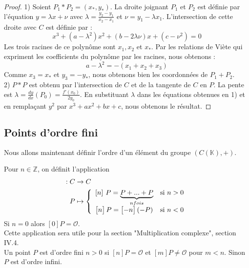 \documentclass[a4paper]{article}
\begin{document}
\begin{proof}
1) Soient $P_{1}*P_{2}=(x_{*},y_{*})$.
La droite joignant $P_{1}$ et $P_{2}$ est définie par l'équation $y=\lambda x+\nu$ avec $\lambda=\frac{y_{2}-y_{1}}{x_{2}-x_{1}}$ et $\nu=y_{1}-\lambda x_{1}$.
L'intersection de cette droite avec $C$ est définie par :
\begin{equation*}
x^3+(a-\lambda^2)x^2+(b-2\lambda\nu)x+(c-\nu^2)=0
\end{equation*}
Les trois racines de ce polynôme sont $x_{1},x_{2}$ et $x_{*}$.
Par les relations de Viète qui expriment les coefficients du polynôme par les racines, nous obtenons :
\begin{equation*}
a-\lambda^2=-(x_{1}+x_{2}+x_{3})
\end{equation*}
Comme $x_{3}=x_{*}$ et $y_{3}=-y_{*}$, nous obtenons bien les coordonnées de $P_{1}+P_{2}$. \\
2) $P*P$ est obtenu par l'intersection de $C$ et de la tangente de $C$ en $P$. La pente est $\lambda={\frac{dy}{dx}}(P_{0})=\frac{f'(x_{0})}{2y_{0}}$. En substituant $\lambda$ dans les équations obtenues en 1) et en remplaçant $y^2$ par $x^3+ax^2+bx+c$, nous obtenons le résultat.

\end{proof}

\subsection{Points d'ordre fini} 
\noindent Nous allons maintenant définir l'ordre d'un élément du groupe $(C(\mathbb{K}),+)$.
\begin{definition}
Pour $n \in \mathbb{Z}$, on définit l'application
\begin{align*}
[n] : C &\rightarrow C \\
P &\mapsto \left\{
    \begin{array}{ll}
        [n]\hspace{0.13cm} P =\underbrace{P+...+P}_{n fois} & \mbox{si }n>0 \\
 \begin{bmatrix} n \end{bmatrix}P  =\begin{bmatrix} -n \end{bmatrix}(-P)  & \mbox{si }  n<0
    \end{array}
\right.
\end{align*}
Si $n=0$ alors $[0]P=\mathcal{O}$. \\
Cette application sera utile pour la section "Multiplication complexe", section IV.4. \\
Un point $P$ est d'ordre fini $n>0$ si $[n]P=\mathcal{O}$ et $[m]P \neq \mathcal{O}$ pour $m<n$.
Sinon $P$ est d'ordre infini.
\end{definition}
\end{document}

